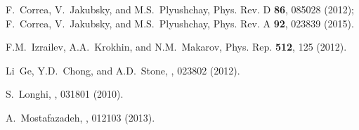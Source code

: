 \documentclass[aps,pra,reprint,showpacs,bibnotes,preprintnumbers,twoside,eqsecnum]{revtex4-1}
\begin{document}
\begin{thebibliography}{99}
F.~Correa, V.~Jakubsky, and M.S.~Plyushchay, Phys. Rev. D {\bf 86}, 085028 (2012);
F.~Correa, V.~Jakubsky, and M.S.~Plyushchay, Phys. Rev. A {\bf 92}, 023839  (2015).

F.M.~Izrailev, A.A.~Krokhin, and N.M.~Makarov, Phys. Rep. {\bf 512}, 125 (2012).

Li~Ge, Y.D.~Chong, and A.D.~Stone, , 023802 (2012).

S.~Longhi, , 031801 (2010).

A.~Mostafazadeh, , 012103 (2013).

\end{thebibliography}
\end{document}

